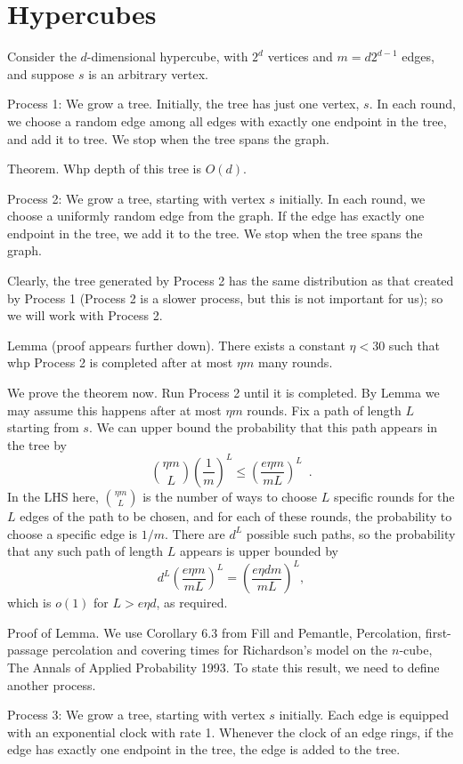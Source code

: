 \documentclass{article}
\begin{document}
\section{Hypercubes}
Consider the $d$-dimensional hypercube,
with $2^d$ vertices and $m=d2^{d-1}$ edges, and suppose $s$ is an arbitrary vertex.

Process 1:
We grow a tree.
Initially, the tree has just one vertex, $s$.
In each round, we choose a random edge among all edges with exactly one endpoint in the tree, and add it to tree.
We stop when the tree spans the graph.

Theorem.
Whp depth of this tree is $O(d)$.

Process 2:
We grow a tree, starting with vertex $s$ initially.
In each round, we choose a uniformly random edge from the graph.
If the edge has exactly one endpoint in the tree, we add it to the tree.
We stop when the tree spans the graph.

Clearly, the tree generated by Process 2 has the same distribution as that created by Process 1
(Process 2 is a slower process, but this is not important for us);
so we will work with Process 2.

Lemma (proof appears further down). There exists a constant $\eta<30$ such that
whp Process 2 is completed after at most $\eta m$ many rounds.

We prove the theorem now.
Run Process 2 until it is completed.
By Lemma we may assume this happens after at most $\eta m$ rounds.
Fix a path of length $L$ starting from $s$. We can upper bound the probability that this path appears in the tree by
$$
\binom{\eta m}{L} \left( \frac{1}{m} \right)^L
\leq \left( \frac{e \eta m}{mL} \right)^L \enspace .
$$
In the LHS here,
$\binom{\eta m}{L}$
is the number of ways to choose $L$ specific rounds for the $L$ edges of the path to be chosen,
and for each of these rounds, the probability to choose a specific edge is $1/m$.
There are $d^L$ possible such paths, so the probability that any such path of length $L$ appears is upper bounded by
$$
d^L
\left( \frac{e \eta m}{mL} \right)^L
= \left( \frac{e \eta d m}{mL} \right)^L,
$$
which is $o(1)$ for $L>e \eta d$, as required.

Proof of Lemma.
We use Corollary 6.3 from
Fill and Pemantle,
Percolation, first-passage percolation and covering
times for Richardson's model on the $n$-cube,
The Annals of Applied Probability 1993.
To state this result, we need to define another process.

Process 3:
We grow a tree, starting with vertex $s$ initially.
Each edge is equipped with an exponential clock with rate 1.
Whenever the clock of an edge rings, if the edge has exactly one endpoint in the tree, the edge is added to the tree.
\end{document}
